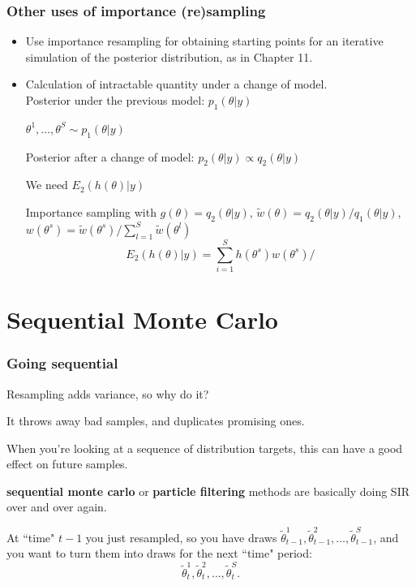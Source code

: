 \documentclass{beamer}
\begin{document}
\begin{frame}[fragile]
  \frametitle{Other uses of importance (re)sampling}
  \begin{itemize}
  \item Use importance resampling for obtaining starting points for an
    iterative simulation of the posterior distribution, as in Chapter
    11.
\pause
\item Calculation of intractable quantity under a change of model.\\

Posterior under the previous model: $p_1(\theta|y)$

$\theta^1, \ldots, \theta^S \sim p_1(\theta|y)$

Posterior after a change of model: $p_2(\theta|y) \propto q_2(\theta|y)$

We need $E_2(h(\theta)|y)$
\pause

Importance sampling with $g(\theta) = q_2(\theta|y)$,
$\tilde{w}(\theta) = q_2(\theta|y)/q_1(\theta|y)$, $w(\theta^s) =
\tilde{w}(\theta^s)/\sum_{l=1}^S \tilde{w}(\theta^l)$
\[
E_2(h(\theta)|y) = \sum_{i=1}^S h(\theta^s) w(\theta^s)/
\]
\end{itemize}
\end{frame}


\section{Sequential Monte Carlo}
\begin{frame}[fragile]
\frametitle{Going sequential}

Resampling adds variance, so why do it?
\newline

It throws away bad samples, and duplicates promising ones. 
\newline

When you're looking at a sequence of distribution targets, this can have a good effect on future samples.
\pause
\newline

{\bf sequential monte carlo} or {\bf particle filtering} methods are basically doing SIR over and over again. 
\newline

At ``time" $t-1$ you just resampled, so you have draws $\tilde{\theta}^1_{t-1}, \tilde{\theta}^2_{t-1}, \ldots, \tilde{\theta}^S_{t-1}$, and you want to turn them into draws for the next ``time" period:
$$
\tilde{\theta}^1_{t}, \tilde{\theta}^2_{t}, \ldots, \tilde{\theta}^S_{t}.
$$

\end{frame}
\end{document}
